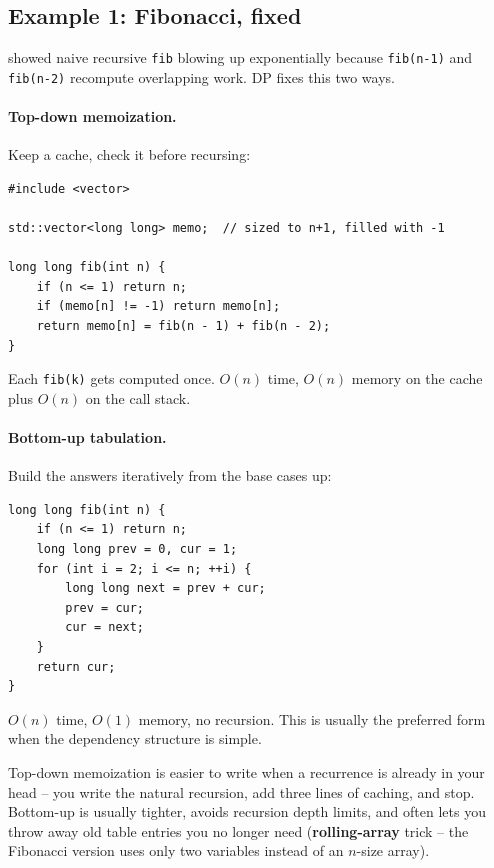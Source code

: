 \documentclass[11pt]{article}
\begin{document}
\subsection{Example 1: Fibonacci, fixed}

 showed naive recursive \texttt{fib} blowing up
exponentially because \texttt{fib(n-1)} and \texttt{fib(n-2)}
recompute overlapping work. DP fixes this two ways.

\paragraph{Top-down memoization.} Keep a cache, check it before
recursing:

\begin{examplebox}
\begin{verbatim}
#include <vector>

std::vector<long long> memo;  // sized to n+1, filled with -1

long long fib(int n) {
    if (n <= 1) return n;
    if (memo[n] != -1) return memo[n];
    return memo[n] = fib(n - 1) + fib(n - 2);
}
\end{verbatim}
Each \texttt{fib(k)} gets computed once. $O(n)$ time, $O(n)$ memory
on the cache plus $O(n)$ on the call stack.
\end{examplebox}

\paragraph{Bottom-up tabulation.} Build the answers iteratively from
the base cases up:

\begin{examplebox}
\begin{verbatim}
long long fib(int n) {
    if (n <= 1) return n;
    long long prev = 0, cur = 1;
    for (int i = 2; i <= n; ++i) {
        long long next = prev + cur;
        prev = cur;
        cur = next;
    }
    return cur;
}
\end{verbatim}
$O(n)$ time, $O(1)$ memory, no recursion. This is usually the
preferred form when the dependency structure is simple.
\end{examplebox}

\begin{ideabox}
Top-down memoization is easier to write when a recurrence is already
in your head -- you write the natural recursion, add three lines of
caching, and stop. Bottom-up is usually tighter, avoids recursion
depth limits, and often lets you throw away old table entries you no
longer need (\textbf{rolling-array} trick -- the Fibonacci version
uses only two variables instead of an $n$-size array).
\end{ideabox}
\end{document}
